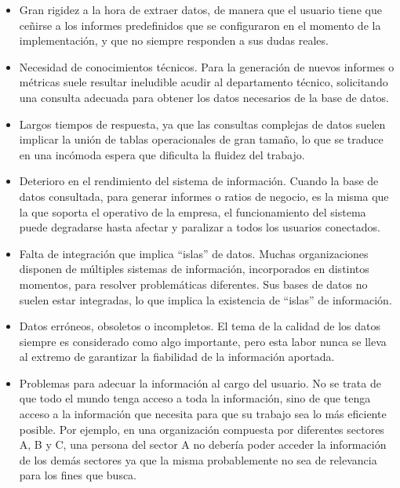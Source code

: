\documentclass[a4paper,11pt]{article}
\begin{document}
    \begin{itemize}
      \item Gran rigidez a la hora de extraer datos, de manera que el usuario tiene que ceñirse a los informes predefinidos que se configuraron en el
      momento de la implementación, y que no siempre responden a sus dudas reales.
      \item Necesidad de conocimientos técnicos. Para la generación de nuevos informes o métricas suele resultar ineludible acudir al departamento técnico,
      solicitando una consulta adecuada para obtener los datos necesarios de la base de datos.
      \item Largos tiempos de respuesta, ya que las consultas complejas de datos suelen implicar la unión de tablas operacionales de gran tamaño, lo que se
      traduce en una incómoda espera que dificulta la fluidez del trabajo.
      \item Deterioro en el rendimiento del sistema de información. Cuando la base de datos consultada, para generar informes o ratios de negocio, es la
      misma que la que soporta el operativo de la empresa, el funcionamiento del sistema puede degradarse hasta afectar y paralizar a todos los usuarios
      conectados.
      \item Falta de integración que implica ``islas'' de datos. Muchas organizaciones disponen de múltiples sistemas de información, incorporados en
      distintos momentos, para resolver problemáticas diferentes. Sus bases de datos no suelen estar integradas, lo que implica la existencia de ``islas''
      de información.
      \item Datos erróneos, obsoletos o incompletos. El tema de la calidad de los datos siempre es considerado como algo importante, pero esta labor nunca
      se lleva al extremo de garantizar la fiabilidad de la información aportada.
      \item Problemas para adecuar la información al cargo del usuario. No se trata de que todo el mundo tenga acceso a toda la información, sino de que
      tenga acceso a la información que necesita para que su trabajo sea lo más eficiente posible. Por ejemplo, en una organización compuesta por
      diferentes sectores A, B y C, una persona del sector A no debería poder acceder la información de los demás sectores ya que la misma probablemente
      no sea de relevancia para los fines que busca.
    \end{itemize}
    
\end{document}
